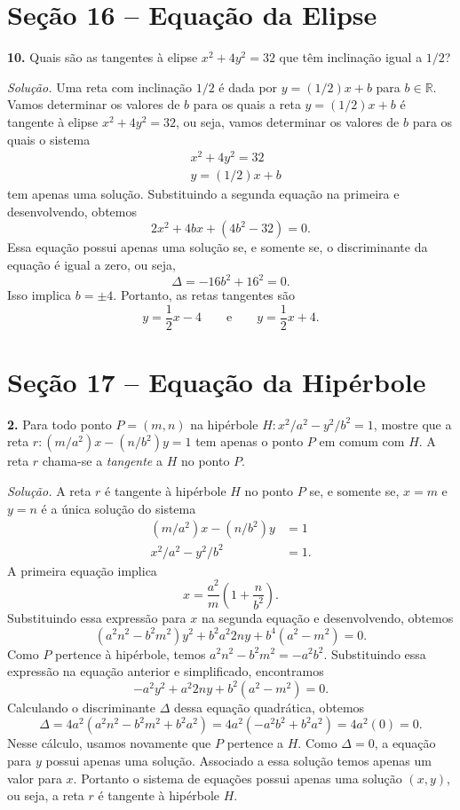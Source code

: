 \documentclass[a4paper,11pt]{article}
\newcommand{\R}{\mathbb{R}}
\begin{document}
\section*{Seção 16 -- Equação da Elipse}

\textbf{10.}
Quais são as tangentes à elipse $x^2 + 4y^2 = 32$ que têm inclinação igual a $1/2$?

\vspace{\baselineskip}

\emph{Solução.}
Uma reta com inclinação $1/2$ é dada por $y = (1/2)x + b$ para $b \in \R$.
Vamos determinar os valores de $b$ para os quais a reta $y = (1/2)x + b$ é tangente à elipse $x^2 + 4y^2 = 32$, ou seja, vamos determinar os valores de $b$ para os quais o sistema
\begin{align*}
  & x^2 + 4y^2 = 32 \\
  & y = (1/2)x + b
\end{align*}
tem apenas uma solução.
Substituindo a segunda equação na primeira e desenvolvendo, obtemos
\[
  2x^2 + 4bx + (4b^2 - 32) = 0.
\]
Essa equação possui apenas uma solução se, e somente se, o discriminante da equação é igual a zero, ou seja,
\[
  \Delta = -16b^2 + 16^2 = 0.
\]
Isso implica $b = \pm 4$.
Portanto, as retas tangentes são
\[
  y = \frac{1}{2} x - 4 \qquad \text{e} \qquad y = \frac{1}{2} x + 4.
\]

\section*{Seção 17 -- Equação da Hipérbole}

\textbf{2.}
Para todo ponto $P = (m,n)$ na hipérbole $H : x^2/a^2 - y^2/b^2 = 1$, mostre que a reta $r: (m/a^2)x - (n/b^2)y = 1$ tem apenas o ponto $P$ em comum com $H$.
A reta $r$ chama-se a \emph{tangente} a $H$ no ponto $P$.

\vspace{\baselineskip}

\emph{Solução.}
A reta $r$ é tangente à hipérbole $H$ no ponto $P$ se, e somente se, $x = m$ e $y = n$ é a única solução do sistema
\begin{align*}
  (m/a^2) x - (n/b^2) y & = 1 \\
  x^2/a^2 - y^2/b^2 & = 1.
\end{align*}
A primeira equação implica
\[
  x = \frac{a^2}{m} \left( 1 + \frac{n}{b^2} \right).
\]
Substituindo essa expressão para $x$ na segunda equação e desenvolvendo, obtemos
\[
  (a^2 n^2 - b^2 m^2) y^2 + b^2 a^2 2ny + b^4(a^2 - m^2) = 0.
\]
Como $P$ pertence à hipérbole, temos $a^2 n^2 - b^2 m^2 = -a^2 b^2$.
Substituindo essa expressão na equação anterior e simplificado, encontramos
\[
  -a^2 y^2 + a^2 2ny + b^2 (a^2 - m^2) = 0.
\]
Calculando o discriminante $\Delta$ dessa equação quadrática, obtemos
\[
  \Delta = 4 a^2 ( a^2 n^2 - b^2 m^2 + b^2 a^2 ) = 4 a^2 (-a^2 b^2 + b^2 a^2 ) = 4 a^2 (0) = 0.
\]
Nesse cálculo, usamos novamente que $P$ pertence a $H$.
Como $\Delta = 0$, a equação para $y$ possui apenas uma solução.
Associado a essa solução temos apenas um valor para $x$.
Portanto o sistema de equações possui apenas uma solução $(x,y)$, ou seja, a reta $r$ é tangente à hipérbole $H$.
\end{document}
